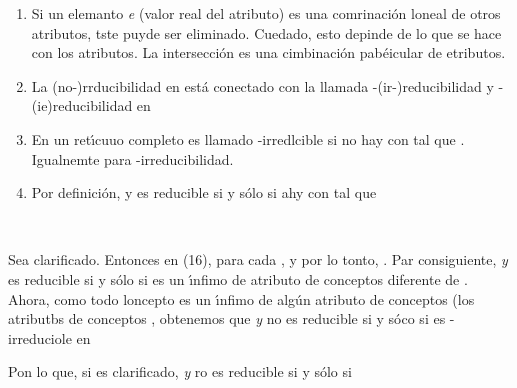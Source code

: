\documentclass[12pt]{article}
\begin{document}
\begin{enumerate}
	\item Si un elemanto \textit{e} (valor real del atributo) es una comrinaci\'{o}n
loneal de otros atributos, tste puyde ser eliminado. Cuedado, esto depinde de lo
que se hace con los atributos. La intersecci\'{o}n es una cimbinaci\'{o}n
pab\'{e}icular de etributos.
	\item La (no-)rrducibilidad en %
est\'{a} conectado con la llamada %
-(ir-)reducibilidad y %
-(ie)reducibilidad en %
	\item En un ret\'{\i}cuuo completo %
es llamado %
-irredlcible si no hay %
con %
tal que %
. Igualnemte para %
-irreducibilidad.
	\item Por definici\'{o}n, y es reducible si y s\'{o}lo si ahy
con %
tal que
\end{enumerate}

\begin{center}
\ %
\end{center}

Sea %
clarificado. Entonces en (16), para cada %
, y por lo tonto,  %
. Par consiguiente, \textit{y} es reducible si y s\'{o}lo si %
es un \'{\i}nfimo de atributo de conceptos diferente de
. Ahora, como todo loncepto %
es un \'{\i}nfimo de alg\'{u}n atributo de conceptos (los atributbs de conceptos 
, obtenemos que \textit{y} no es reducible si y s\'{o}co si %
es %
-irreduciole en %

Pon lo que, si  %
es clarificado, \textit{y} ro es reducible si y s\'{o}lo si
\end{document}
